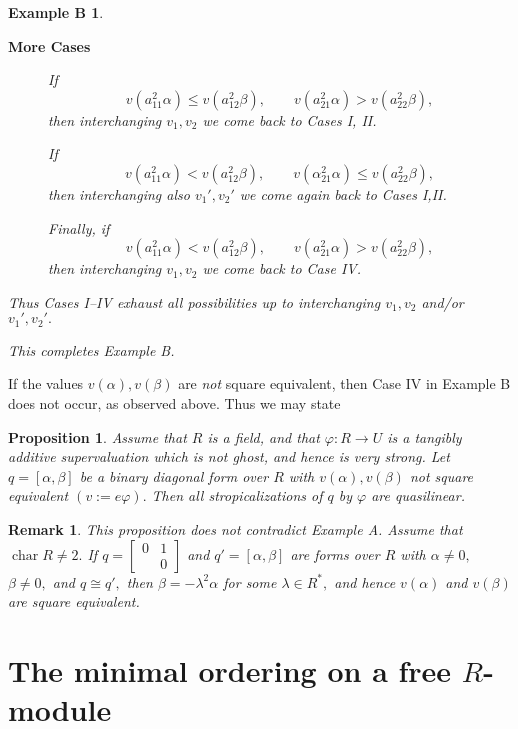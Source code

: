 \documentclass [12pt,a4paper,reqno]{amsart}
\newtheorem{prop}[thm]{Proposition}
\newtheorem*{exampleB*}{Example B}
\newtheorem{remark}[thm]{Remark}
\begin{document}
\begin{exampleB*}
\begin{description}
\item[\textbf{More Cases}]

If $$v(a_{11}^2{\alpha})\le v(a_{12}^2{\beta}),\qquad v(a_{21}^2{\alpha})>v(a_{22}^2{\beta}),$$
then interchanging $v_1,v_2$ we come back to Cases I, II.
{\vskip 1.5mm \noindent}

If $$v(a_{11}^2{\alpha})<v(a_{12}^2{\beta}),\qquad v({\alpha}_{21}^2{\alpha})\le v(a_{22}^2{\beta}),$$
then interchanging also $v_1',v_2'$ we come again  back to Cases I,II.

{\vskip 1.5mm \noindent}

Finally, if
$$v(a_{11}^2{\alpha})<v(a_{12}^2{\beta}),\qquad v(a_{21}^2{\alpha})>v(a_{22}^2{\beta}),$$
then interchanging $v_1,v_2$ we come  back to Case IV.

\end{description}
Thus Cases I--IV exhaust all possibilities up to interchanging $v_1,v_2$ and/or $v_1',v_2'.$

This completes Example B.
\end{exampleB*}

If the values $v({\alpha}),v({\beta})$ are \textit{not} square equivalent, then Case IV in Example B does not occur, as observed above. Thus we may state

\begin{prop}\label{prop:II.8.1}
Assume that $R$ is a field, and that ${\varphi}:R\to U$ is a tangibly additive supervaluation which is not ghost, and hence is very strong. Let $q=[{\alpha},{\beta}]$ be a binary diagonal form over $R$ with $v({\alpha}),v({\beta})$ not square equivalent $(v:=e{\varphi}).$ Then all stropicalizations of $q$ by ${\varphi}$ are quasilinear.
\end{prop}

\begin{remark}\label{rem:II.8.2}
This proposition does not contradict Example A. Assume that ${\operatorname{char}} R\ne2.$ If $q=\left[\begin{smallmatrix}0 & 1\\  & 0\end{smallmatrix}\right]$ and $q'=[{\alpha},{\beta}]$ are forms over $R$ with ${\alpha}\ne0,$ ${\beta}\ne0,$ and $q\cong q',$ then ${\beta}=-{\lambda}^2{\alpha}$ for some ${\lambda}\in R^*,$ and hence $v({\alpha})$ and $v({\beta})$ are square equivalent.
\end{remark}

\section{The minimal ordering on a free $R$-module}\label{sec:I.6}
\end{document}
